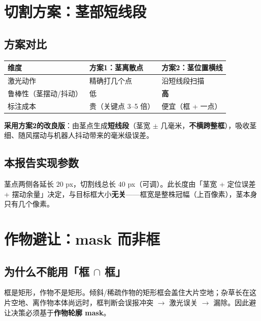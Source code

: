 \documentclass[11pt,a4paper]{article}
\begin{document}
\section{切割方案：茎部短线段}

\subsection{方案对比}

\begin{table}[h]
\centering
\begin{tabular}{lll}
\toprule
\textbf{维度} & \textbf{方案1：茎离散点} & \textbf{方案2：茎位置横线} \\
\midrule
激光动作 & 精确打几个点 & 沿短线段扫描 \\
鲁棒性（茎摆动/抖动） & 低 & \textbf{高} \\
标注成本 & 贵（关键点 3--5 倍） & 便宜（框 + 一点） \\
\bottomrule
\end{tabular}
\end{table}

\textbf{采用方案2的改良版}：由茎点生成\textbf{短线段}（茎宽 $\pm$ 几毫米，\textbf{不横跨整框}），吸收茎细、随风摆动与机器人抖动带来的毫米级误差。

\subsection{本报告实现参数}

茎点两侧各延长 $20$ px，切割线总长 $40$ px（可调）。此长度由「茎宽 + 定位误差 + 摆动余量」决定，与目标框大小\textbf{无关}——框宽是整株冠幅（上百像素），茎本身只有几个像素。

\section{作物避让：mask 而非框}

\subsection{为什么不能用「框 $\cap$ 框」}

框是矩形，作物不是矩形。倾斜/稀疏作物的矩形框会盖住大片空地；杂草长在这片空地、离作物本体尚远时，框判断会误报冲突 $\to$ 激光误关 $\to$ 漏除。因此避让决策必须基于\textbf{作物轮廓 mask}。
\end{document}
